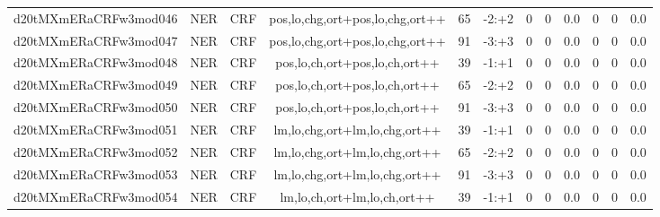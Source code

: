 \documentclass[a4paper]{article}
\begin{document}
\begin{landscape}
\begin{center}
\begin{tabular}{ |c|c|c|c|c|c|c|c|c|c|c|c|}
 
 	
 	\small{ d20tMXmERaCRFw3mod046 } & \small{ NER} & \small{  CRF }  & pos,lo,chg,ort+pos,lo,chg,ort++  &  65 &  \small{  -2:+2 }  &  0 & 0 & 0.0  &  0 & 0 & 0.0 \\
 	

 
 	
 	\small{ d20tMXmERaCRFw3mod047 } & \small{ NER} & \small{  CRF }  & pos,lo,chg,ort+pos,lo,chg,ort++  &  91 &  \small{  -3:+3 }  &  0 & 0 & 0.0  &  0 & 0 & 0.0 \\
 	

 
 	
 	\small{ d20tMXmERaCRFw3mod048 } & \small{ NER} & \small{  CRF }  & pos,lo,ch,ort+pos,lo,ch,ort++  &  39 &  \small{  -1:+1 }  &  0 & 0 & 0.0  &  0 & 0 & 0.0 \\
 	

 
 	
 	\small{ d20tMXmERaCRFw3mod049 } & \small{ NER} & \small{  CRF }  & pos,lo,ch,ort+pos,lo,ch,ort++  &  65 &  \small{  -2:+2 }  &  0 & 0 & 0.0  &  0 & 0 & 0.0 \\
 	

 
 	
 	\small{ d20tMXmERaCRFw3mod050 } & \small{ NER} & \small{  CRF }  & pos,lo,ch,ort+pos,lo,ch,ort++  &  91 &  \small{  -3:+3 }  &  0 & 0 & 0.0  &  0 & 0 & 0.0 \\
 	

 
 	
 	\small{ d20tMXmERaCRFw3mod051 } & \small{ NER} & \small{  CRF }  & lm,lo,chg,ort+lm,lo,chg,ort++  &  39 &  \small{  -1:+1 }  &  0 & 0 & 0.0  &  0 & 0 & 0.0 \\
 	

 
 	
 	\small{ d20tMXmERaCRFw3mod052 } & \small{ NER} & \small{  CRF }  & lm,lo,chg,ort+lm,lo,chg,ort++  &  65 &  \small{  -2:+2 }  &  0 & 0 & 0.0  &  0 & 0 & 0.0 \\
 	

 
 	
 	\small{ d20tMXmERaCRFw3mod053 } & \small{ NER} & \small{  CRF }  & lm,lo,chg,ort+lm,lo,chg,ort++  &  91 &  \small{  -3:+3 }  &  0 & 0 & 0.0  &  0 & 0 & 0.0 \\
 	

 
 	
 	\small{ d20tMXmERaCRFw3mod054 } & \small{ NER} & \small{  CRF }  & lm,lo,ch,ort+lm,lo,ch,ort++  &  39 &  \small{  -1:+1 }  &  0 & 0 & 0.0  &  0 & 0 & 0.0 \\
 	


\end{tabular}
\end{center}
\end{landscape}
\end{document}

